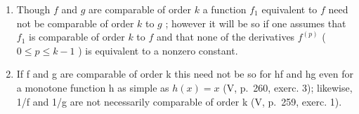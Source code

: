 \begin{enumerate}
\def\labelenumi{\arabic{enumi})}
\setcounter{enumi}{1}
\item
  Though \(f\) and \(g\) are comparable of order \(k\) a function \(f_{1}\) equivalent to \(f\) need not be comparable of order \(k\) to \(g\) ; however it will be so if one assumes that \(f_{1}\) is comparable of order \(k\) to \(f\) and that none of the derivatives \(f^{(p)}\) ( \(0 \leqslant p \leqslant k - 1\) ) is equivalent to a nonzero constant.
\item
  If f and g are comparable of order k this need not be so for hf and hg even for a monotone function h as simple as \(h(x) = x\) (V, p.~260, exerc. 3); likewise, 1/f and 1/g are not necessarily comparable of order k (V, p.~259, exerc. 1).
\end{enumerate}

